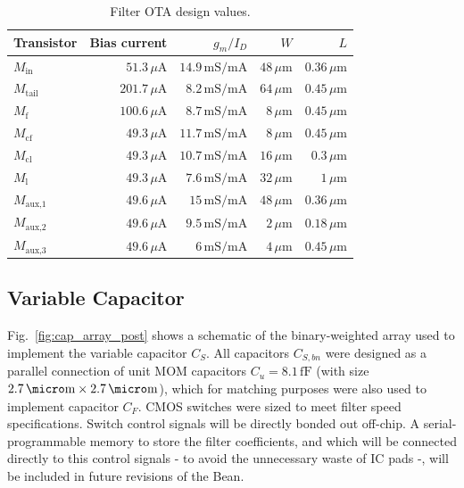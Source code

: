 \begin{table}[!t]
	\begin{center}
		\begin{tabular}{|l|r|r|r|r|}\hline
			Transistor & Bias current & $g_m/I_D$ & $W$ & $L$ \\ \hline\hline
			$M_\text{in}$ & $51.3\,\mu\text{A}$  & $14.9\,\text{mS}/\text{mA}$  & $48\,\mu\text{m}$ & $0.36\,\mu\text{m}$ \\ \hline
			$M_\text{tail}$ & $201.7\,\mu\text{A}$  & $8.2\,\text{mS}/\text{mA}$  & $64\,\mu\text{m}$ & $0.45\,\mu\text{m}$ \\ \hline 
			$M_\text{f}$ & $100.6\,\mu\text{A}$  & $8.7\,\text{mS}/\text{mA}$  & $8\,\mu\text{m}$ & $0.45\,\mu\text{m}$ \\ \hline
			$M_\text{cf}$ & $49.3\,\mu\text{A}$  & $11.7\,\text{mS}/\text{mA}$  & $8\,\mu\text{m}$ & $0.45\,\mu\text{m}$ \\ \hline
			$M_\text{cl}$ & $49.3\,\mu\text{A}$  & $10.7\,\text{mS}/\text{mA}$  & $16\,\mu\text{m}$ & $0.3\,\mu\text{m}$ \\ \hline
			$M_\text{l}$ & $49.3\,\mu\text{A}$  & $7.6\,\text{mS}/\text{mA}$  & $32\,\mu\text{m}$ & $1\,\mu\text{m}$ \\ \hline
			$M_\text{aux,1}$ & $49.6\,\mu\text{A}$  & $15\,\text{mS}/\text{mA}$  & $48\,\mu\text{m}$ & $0.36\,\mu\text{m}$ \\ \hline
			$M_\text{aux,2}$ & $49.6\,\mu\text{A}$  & $9.5\,\text{mS}/\text{mA}$  & $2\,\mu\text{m}$ & $0.18\,\mu\text{m}$ \\ \hline
			$M_\text{aux,3}$ & $49.6\,\mu\text{A}$  & $6\,\text{mS}/\text{mA}$  & $4\,\mu\text{m}$ & $0.45\,\mu\text{m}$ \\ \hline
		\end{tabular}
		\vspace*{5pt}
		\caption{Filter OTA design values.}
		\label{tab:OTA_sizes}
	\end{center}
\end{table}



\subsection{Variable Capacitor}

Fig.~\ref{fig:cap_array_post} shows a schematic of the binary-weighted array used to implement the variable capacitor $C_S$. All capacitors $C_{S,bn}$ were designed as a parallel connection of unit MOM capacitors $C_u=8.1\,\text{fF}$  (with size $2.7\,\micro\text{m}\times2.7\,\micro\text{m}$), which for matching purposes were also used to implement capacitor $C_F$. CMOS switches were sized to meet filter speed specifications.  Switch control signals will be directly bonded out off-chip. A \mbox{serial-programmable} memory to store the filter coefficients, and which will be connected directly to this control signals - to avoid the \mbox{unnecessary} waste of IC pads -, will be included in future revisions of the Bean.

